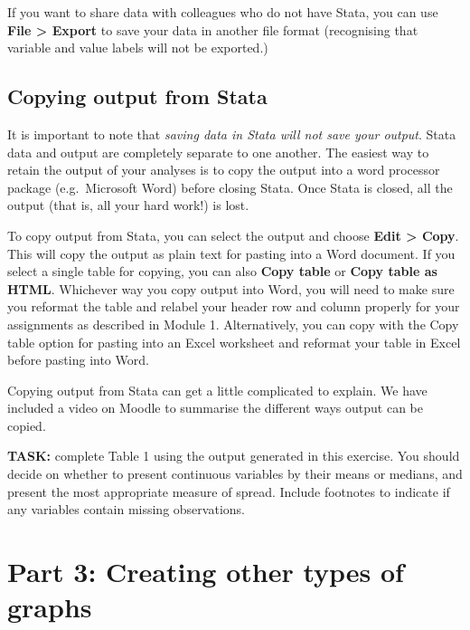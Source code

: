 \documentclass[
]{memoir}
\begin{document}
If you want to share data with colleagues who do not have Stata, you can use \textbf{File \textgreater{} Export} to save your data in another file format (recognising that variable and value labels will not be exported.)

\hypertarget{copying-output-from-stata}{%
\subsection{Copying output from Stata}\label{copying-output-from-stata}}

It is important to note that \emph{saving data in Stata will not save your output}. Stata data and output are completely separate to one another. The easiest way to retain the output of your analyses is to copy the output into a word processor package (e.g.~Microsoft Word) before closing Stata. Once Stata is closed, all the output (that is, all your hard work!) is lost.

To copy output from Stata, you can select the output and choose \textbf{Edit \textgreater{} Copy}. This will copy the output as plain text for pasting into a Word document. If you select a single table for copying, you can also \textbf{Copy table} or \textbf{Copy table as HTML}. Whichever way you copy output into Word, you will need to make sure you reformat the table and relabel your header row and column properly for your assignments as described in Module 1. Alternatively, you can copy with the Copy table option for pasting into an Excel worksheet and reformat your table in Excel before pasting into Word.

Copying output from Stata can get a little complicated to explain. We have included a video on Moodle to summarise the different ways output can be copied.

\textbf{TASK:} complete Table 1 using the output generated in this exercise. You should decide on whether to present continuous variables by their means or medians, and present the most appropriate measure of spread. Include footnotes to indicate if any variables contain missing observations.

\hypertarget{part-3-creating-other-types-of-graphs}{%
\section*{Part 3: Creating other types of graphs}\label{part-3-creating-other-types-of-graphs}}
\end{document}
